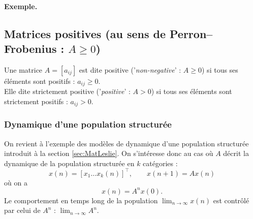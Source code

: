 \paragraph*{Exemple.} 

\subsection{Matrices positives (au sens de Perron–Frobenius : $A \geq 0$)} 


\begin{definition*}
  Une matrice $A = [a_{ij}]$ est dite positive ('{\em non-negative}' : $A \geq 0$) si tous ses éléments sont positifs : $a_{ij} \geq 0$. \\
  Elle dite strictement positive ('{\em positive}' : $A > 0$) si tous ses éléments sont strictement positifs : $a_{ij} > 0$. 
\end{definition*}

\subsubsection{Dynamique d'une population structurée}

On revient à l'exemple des modèles de dynamique d'une population structurée introduit à la section \ref{sec:MatLeslie}. On s'intéresse donc au cas où $A$ décrit la dynamique de la population structurée en $k$ catégories : 
$$
x(n) = [x_1 \dots x_k(n)]^\top, \qquad x(n+1) = A x(n)
$$
où on a
$$
x(n) = A^n x(0).
$$
Le comportement en temps long de la population $\lim_{n \rightarrow\infty} x(n)$ est contrôlé par celui de $A^n$ : $\lim_{n \rightarrow\infty} A^n$.



